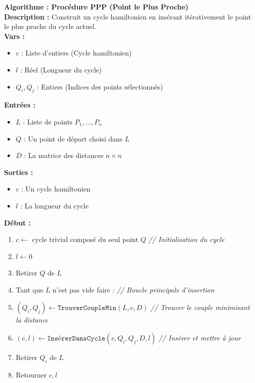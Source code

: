 \documentclass[a4paper, 12pt]{article}
\begin{document}
\begin{tcolorbox}[colback=darkWhite!75!white,colframe=black!30,left=5pt,right=5pt,top=5pt,bottom=5pt]
\textbf{Algorithme : Procédure PPP (Point le Plus Proche)} \\
\textbf{Description :} Construit un cycle hamiltonien en insérant itérativement le point le plus proche du cycle actuel. \\
\textbf{Vars :}
\begin{itemize}
    \item $c$ : Liste d'entiers (Cycle hamiltonien)
    \item $l$ : Réel (Longueur du cycle)
    \item $Q_i, Q_j$ : Entiers (Indices des points sélectionnés)
\end{itemize}
\textbf{Entrées :}
\begin{itemize}
    \item $L$ : Liste de points $P_1, \dots, P_n$ 
    \item $Q$ : Un point de départ choisi dans $L$
    \item $D$ : La matrice des distances $n \times n$
\end{itemize}
\textbf{Sorties :}
\begin{itemize}
    \item $c$ : Un cycle hamiltonien
    \item $l$ : La longueur du cycle
\end{itemize}
\textbf{Début :}
\begin{enumerate}
    \item $c \leftarrow$ cycle trivial composé du seul point $Q$ \textit{// Initialisation du cycle}
    \item $l \leftarrow 0$
    \item Retirer $Q$ de $L$
    \item Tant que $L$ n'est pas vide faire : \textit{// Boucle principale d'insertion}
    \item \quad $(Q_i, Q_j) \leftarrow \texttt{TrouverCoupleMin}(L, c, D)$ \textit{// Trouver le couple minimisant la distance}
    \item \quad $(c, l) \leftarrow \texttt{InsérerDansCycle}(c, Q_i, Q_j, D, l)$ \textit{// Insérer et mettre à jour}
    \item \quad Retirer $Q_i$ de $L$
    \item Retourner $c, l$
\end{enumerate}
\end{tcolorbox}
\end{document}

